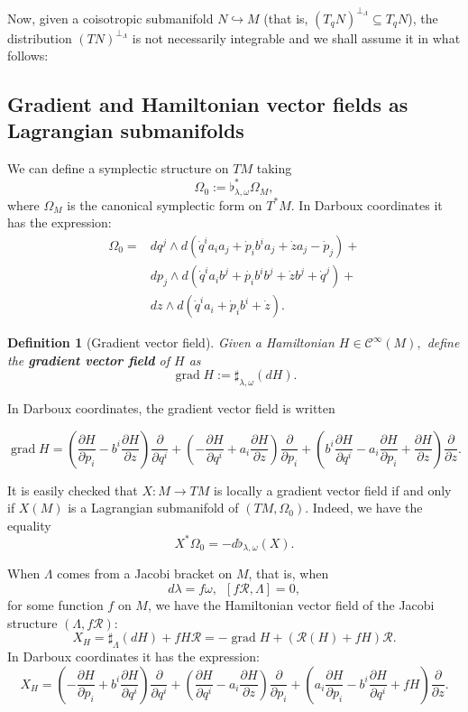 \documentclass[12pt]{article}
\newtheorem{Def}{Definition}[section]
\newcommand{\grad}{\operatorname{grad}}
\newcommand{\partder}[2]{\frac{\partial #1}{\partial #2}}
\begin{document}
Now, given a coisotropic submanifold $N \hookrightarrow M$ (that is, $(T_qN)^{\perp_\Lambda} \subseteq T_qN$), the distribution $(TN)^{\perp_\Lambda}$ is not necessarily integrable and we shall assume it in what follows:
\subsection[Hamiltonian vector fields as Lagrangian submanifolds]{Gradient and Hamiltonian vector fields as Lagrangian submanifolds}
We can define a symplectic structure on $TM$ taking $$\Omega_0 := \flat_{\lambda, \omega} ^* \Omega_M,$$ where $\Omega_M$ is the canonical symplectic form on $T^*M$. In Darboux coordinates it has the expression:
\begin{align*}
  \Omega_0 =& dq^j \wedge d\left (\dot{q}^ia_ia_j + \dot{p}_ib^ia_j+ \dot{z}a_j - \dot{p}_j \right)  + \\
   & dp_j \wedge d\left( \dot{q}^ia_ib^j + \dot{p_i}b^ib^j + \dot{z}b^j + \dot{q}^j \right)+ \\
   &  dz \wedge d\left( \dot{q}^ia_i + \dot{p}_ib^i + \dot{z}\right).
\end{align*}

\begin{Def}[Gradient vector field] Given a Hamiltonian $H \in \mathcal{C}^ \infty(M),$ define the \textbf{gradient vector field} of $H$ as $$\grad H:= \sharp_{\lambda, \omega}(dH).$$
\end{Def}
In Darboux coordinates, the gradient vector field is written

$$\grad H = \left ( \partder{H}{p_i} - b^i \partder{H}{z} \right) \partder{}{q^i} + \left( - \partder{H}{q^i} + a_i \partder{H}{z}\right) \partder{}{p_i} + \left( b^i\partder{H}{q^i} - a_i\partder{H}{p_i} + \partder{H}{z}\right) \partder{}{z}.$$

It is easily checked that $X: M \rightarrow TM$ is locally a gradient vector field if and only if $X(M)$ is a Lagrangian submanifold of $(TM, \Omega_0)$. Indeed, we have the equality $$X^*\Omega_0 = - d\flat_{\lambda, \omega}(X).$$

When $\Lambda$ comes from a Jacobi bracket on $M$, that is, when $$d\lambda = f \omega, \,\,\, [f \mathcal{R}, \Lambda] = 0,$$ for some function $f$ on $M$, we have the Hamiltonian vector field of the Jacobi structure $(\Lambda, f \mathcal{R})$: 
$$X_H = \sharp_\Lambda(dH ) + f H \mathcal{R} = -\grad H + (\mathcal{R}(H) + fH )\mathcal{R} .$$ In Darboux coordinates it has the expression:
$$X_H = \left ( - \partder{H}{p_i}+ b^i \partder{H}{q^i}\right) \partder{}{q^i} + \left( \partder{H}{q^i} - a_i \partder{H}{z}\right) \partder{}{p_i} + \left( a_i \partder{H}{p_i} - b^i \partder{H}{q^i} + f H\right) \partder{}
{z}.$$
\end{document}
